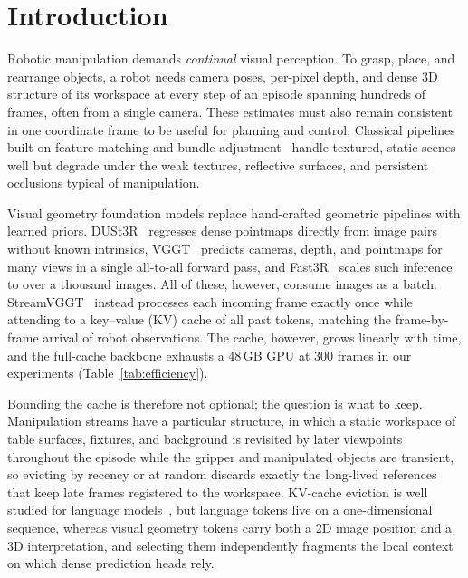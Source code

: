 \section{Introduction}
\label{sec:intro}

Robotic manipulation demands \emph{continual} visual perception. To grasp, place, and rearrange objects, a robot needs camera poses, per-pixel depth, and dense 3D structure of its workspace at every step of an episode spanning hundreds of frames, often from a single camera. These estimates must also remain consistent in one coordinate frame to be useful for planning and control. Classical pipelines built on feature matching and bundle adjustment~\cite{schonberger2016sfm} handle textured, static scenes well but degrade under the weak textures, reflective surfaces, and persistent occlusions typical of manipulation.

Visual geometry foundation models replace hand-crafted geometric pipelines with learned priors. DUSt3R~\cite{wang2024dust3r} regresses dense pointmaps directly from image pairs without known intrinsics, VGGT~\cite{wang2025vggt} predicts cameras, depth, and pointmaps for many views in a single all-to-all forward pass, and Fast3R~\cite{yang2025fast3r} scales such inference to over a thousand images. All of these, however, consume images as a batch. StreamVGGT~\cite{zhuo2025streamvggt} instead processes each incoming frame exactly once while attending to a key--value (KV) cache of all past tokens, matching the frame-by-frame arrival of robot observations. The cache, however, grows linearly with time, and the full-cache backbone exhausts a 48\,GB GPU at 300 frames in our experiments (Table~\ref{tab:efficiency}).

Bounding the cache is therefore not optional; the question is what to keep. Manipulation streams have a particular structure, in which a static workspace of table surfaces, fixtures, and background is revisited by later viewpoints throughout the episode while the gripper and manipulated objects are transient, so evicting by recency or at random discards exactly the long-lived references that keep late frames registered to the workspace. KV-cache eviction is well studied for language models~\cite{zhang2023h2o,xiao2024streamingllm}, but language tokens live on a one-dimensional sequence, whereas visual geometry tokens carry both a 2D image position and a 3D interpretation, and selecting them independently fragments the local context on which dense prediction heads rely.

